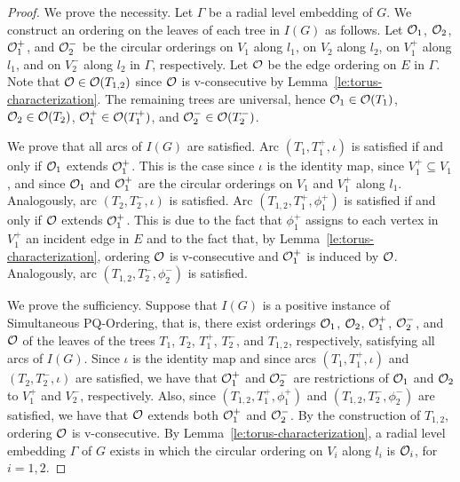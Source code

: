 \documentclass{llncs}
\begin{document}
\begin{proof}
We prove the necessity. Let $\Gamma$ be a radial level embedding of $G$. We construct an ordering on the leaves of each tree in $I(G)$ as follows. Let ${\cal O}_1$, ${\cal O}_2$, ${\cal O}^+_1$, and ${\cal O}^-_2$ be the circular orderings on $V_1$ along $l_1$, on $V_2$ along $l_2$, on $V_1^+$ along $l_1$, and on $V_2^-$ along $l_2$ in $\Gamma$, respectively. Let ${\cal O}$ be the edge ordering on $E$ in $\Gamma$. Note that ${\cal O}\in {\cal O}(T_{1,2})$ since ${\cal O}$ is v-consecutive by Lemma~\ref{le:torus-characterization}. The remaining trees are universal, hence ${\cal O}_{1}\in {\cal O}(T_{1})$, ${\cal O}_{2}\in {\cal O}(T_{2})$, ${\cal O}^+_{1}\in {\cal O}(T^+_{1})$, and ${\cal O}^-_{2}\in {\cal O}(T^-_{2})$. 

We prove that all arcs of $I(G)$ are satisfied. Arc $(T_1,T_1^+,\iota)$ is satisfied if and only if ${\cal O}_1$ extends ${\cal O}^+_1$. This is the case since $\iota$ is the identity map, since $V_1^+ \subseteq V_1$, and since ${\cal O}_1$ and ${\cal O}^+_1$ are the circular orderings on $V_1$ and $V_1^+$ along $l_1$. Analogously, arc $(T_2,T_2^-,\iota)$ is satisfied. Arc $(T_{1,2},T_1^+,\phi^+_1)$ is satisfied if and only if ${\cal O}$ extends ${\cal O}^+_1$. This is due to the fact that $\phi^+_1$ assigns to each vertex in $V_1^+$ an incident edge in $E$ and to the fact that, by Lemma~\ref{le:torus-characterization}, ordering ${\cal O}$ is v-consecutive and ${\cal O}^+_1$ is induced by ${\cal O}$. Analogously, arc $(T_{1,2},T_{2}^-,\phi^-_2)$ is satisfied.  

We prove the sufficiency. Suppose that $I(G)$ is a positive instance of {\sc Simultaneous PQ-Ordering}, that is, there exist orderings ${\cal O}_1$, ${\cal O}_2$, ${\cal O}^+_1$, ${\cal O}^-_2$, and ${\cal O}$ of the leaves of the trees $T_1$, $T_2$, $T^+_1$, $T^-_2$, and $T_{1,2}$, respectively, satisfying all arcs of $I(G)$. 
Since $\iota$ is the identity map and since arcs $(T_1,T_1^+,\iota)$ and $(T_2,T_2^-,\iota)$ are satisfied, we have that ${\cal O}^+_1$ and ${\cal O}^-_2$ are restrictions of ${\cal O}_1$ and ${\cal O}_2$ to $V_1^+$ and $V_2^-$, respectively. Also, since $(T_{1,2},T_1^+,\phi^+_1)$ and $(T_{1,2},T_{2}^-,\phi^-_2)$ are satisfied, we have that ${\cal O}$ extends both ${\cal O}^+_1$ and ${\cal O}^-_2$. By the construction of $T_{1,2}$, ordering ${\cal O}$ is v-consecutive. By Lemma~\ref{le:torus-characterization}, a radial level embedding $\Gamma$ of $G$ exists in which the circular ordering on $V_i$ along $l_i$ is ${\cal O}_i$, for $i=1,2$.
\end{proof}
\end{document}
